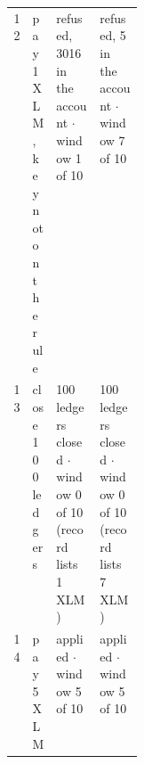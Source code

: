 \begin{table}[tbp]
\begin{tabularx}{\linewidth}{@{}r>{\raggedright\arraybackslash}p{0.17\linewidth}LL@{}}
12 & pay 1 XLM, key not on the rule & refused, 3016 in the account \ensuremath{\cdot} window 1 of 10 & refused, 5 in the account \ensuremath{\cdot} window 7 of 10 \\
13 & close 100 ledgers & 100 ledgers closed \ensuremath{\cdot} window 0 of 10 (record lists 1 XLM) & 100 ledgers closed \ensuremath{\cdot} window 0 of 10 (record lists 7 XLM) \\
14 & pay 5 XLM & applied \ensuremath{\cdot} window 5 of 10 & applied \ensuremath{\cdot} window 5 of 10 \\
\bottomrule
\end{tabularx}
\end{table}
